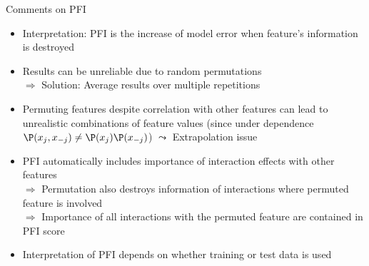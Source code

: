 \documentclass[11pt,compress,t,notes=noshow, aspectratio=169, xcolor=table]{beamer}
\begin{document}
\begin{frame}{Comments on PFI}
 \begin{itemize}[<+->]
 \itemsep1em
  \item Interpretation: PFI is the increase of model error when feature's information is destroyed
  \item Results can be unreliable due to random permutations \\
  $\Rightarrow$ Solution: Average results over multiple repetitions
  \item Permuting features despite correlation with other features can lead to unrealistic combinations of feature values (since under dependence $\P(x_j,x_{-j}) \neq \P(x_j) \P(x_{-j})$) $\leadsto$ Extrapolation issue
  \item PFI automatically includes importance of interaction effects with other features \\
  $\Rightarrow$ Permutation also destroys information of interactions where permuted feature is involved\\
  $\Rightarrow$ Importance of all interactions with the permuted feature are contained in PFI score %
  \item Interpretation of PFI depends on whether training or test data is used
 \end{itemize}
\end{frame}
\end{document}
